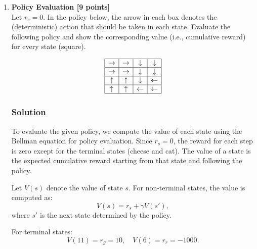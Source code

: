 \documentclass{article}
\begin{document}
\begin{enumerate}[label=(\alph*)]
    \item \textbf{Policy Evaluation [9 points]} \\
    Let $r_s = 0$. In the policy below, the arrow in each box denotes the (deterministic) action that should be taken in each state. Evaluate the following policy and show the corresponding value (i.e., cumulative reward) for every state (square).

    \[
    \begin{array}{|c|c|c|c|}
    \hline
    \rightarrow & \rightarrow & \downarrow & \downarrow \\ \hline
    \rightarrow & \rightarrow & \downarrow & \downarrow \\ \hline
    \uparrow & \uparrow & \downarrow & \leftarrow \\ \hline
    \uparrow & \uparrow & \leftarrow & \leftarrow \\ \hline
    \end{array}
    \]

    \subsubsection*{Solution}
    To evaluate the given policy, we compute the value of each state using the Bellman equation for policy evaluation. Since \( r_s = 0 \), the reward for each step is zero except for the terminal states (cheese and cat). The value of a state is the expected cumulative reward starting from that state and following the policy.

    Let \( V(s) \) denote the value of state \( s \). For non-terminal states, the value is computed as:
    \[
    V(s) = r_s + \gamma V(s'),
    \]
    where \( s' \) is the next state determined by the policy.

    For terminal states:
    \[
    V(11) = r_g = 10, \quad V(6) = r_r = -1000.
    \]



\end{enumerate}
\end{document}
